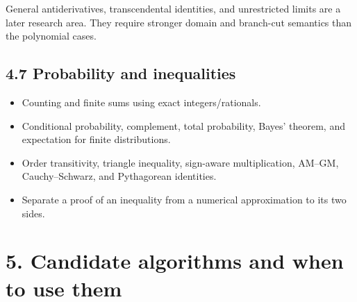 \documentclass[
  10pt,
]{article}
\providecommand{\tightlist}{%
  \setlength{\itemsep}{0pt}\setlength{\parskip}{0pt}}
\begin{document}
General antiderivatives, transcendental identities, and unrestricted
limits are a later research area. They require stronger domain and
branch-cut semantics than the polynomial cases.

\subsection{4.7 Probability and
inequalities}\label{probability-and-inequalities}

\begin{itemize}
\tightlist
\item
  Counting and finite sums using exact integers/rationals.
\item
  Conditional probability, complement, total probability, Bayes'
  theorem, and expectation for finite distributions.
\item
  Order transitivity, triangle inequality, sign-aware multiplication,
  AM--GM, Cauchy--Schwarz, and Pythagorean identities.
\item
  Separate a proof of an inequality from a numerical approximation to
  its two sides.
\end{itemize}

\section{5. Candidate algorithms and when to use
them}\label{candidate-algorithms-and-when-to-use-them}
\end{document}
